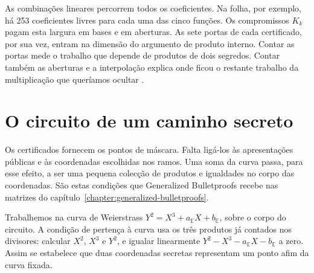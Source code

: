 As combinações lineares percorrem todos os coeficientes. Na folha,
por exemplo, há 253 coeficientes livres para cada uma das cinco
funções. Os compromissos \(K_k\) pagam esta largura em bases e em
aberturas. As sete portas de cada certificado, por sua vez, entram
na dimensão do argumento de produto interno. Contar as portas mede
o trabalho que depende de produtos de dois segredos. Contar também
as aberturas e a interpolação explica onde ficou o restante trabalho
da multiplicação que queríamos ocultar
\cite{monero-oxide-fcmp-source,generalized-bulletproofs-fixed}.\label{page:fcmp-certificados-fim}

\section{O circuito de um caminho secreto}
\label{sec:fcmp-circuit-addition}
\label{sec:fcmp-circuit-membership}
\label{sec:fcmp-circuit-layers}
\label{sec:fcmp-circuit-dimensions}
\label{sec:fcmp-gbp-statement}
\label{sec:fcmp-gbp-polynomial}
\label{sec:fcmp-gbp-ipa-reduction}
\label{sec:fcmp-gbp-security-interface}

Os certificados fornecem os pontos de máscara. Falta ligá-los
às apresentações públicas e às coordenadas escolhidas nos
ramos. Uma soma da curva passa, para esse efeito, a ser uma
pequena colecção de produtos e igualdades no corpo das
coordenadas. São estas condições que Generalized Bulletproofs
recebe nas matrizes do capítulo~\ref{chapter:generalized-bulletproofs}.

Trabalhemos na curva de Weierstrass
\(Y^2=X^3+a_{\mathbb E}X+b_{\mathbb E}\), sobre o corpo
do circuito. A condição de pertença à curva usa os três
produtos já contados nos divisores: calcular \(X^2\),
\(X^3\) e \(Y^2\), e igualar linearmente
\(Y^2-X^3-a_{\mathbb E}X-b_{\mathbb E}\) a zero.
Assim se estabelece que duas coordenadas secretas representam
um ponto afim da curva fixada.

